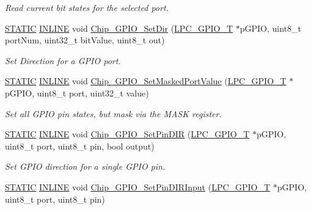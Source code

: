 \begin{DoxyCompactItemize}
\begin{DoxyCompactList}\small\item\em Read current bit states for the selected port. \end{DoxyCompactList}\item 
\hyperlink{group__LPC__Types__Public__Macros_ga10b2d890d871e1489bb02b7e70d9bdfb}{S\+T\+A\+T\+IC} \hyperlink{group__LPC__Types__Public__Types_ga2eb6f9e0395b47b8d5e3eeae4fe0c116}{I\+N\+L\+I\+NE} void \hyperlink{group__GPIO__17XX__40XX_gacc2acb3d50b47954b25ef0ac439993d8}{Chip\+\_\+\+G\+P\+I\+O\+\_\+\+Set\+Dir} (\hyperlink{structLPC__GPIO__T}{L\+P\+C\+\_\+\+G\+P\+I\+O\+\_\+T} $\ast$p\+G\+P\+IO, uint8\+\_\+t port\+Num, uint32\+\_\+t bit\+Value, uint8\+\_\+t out)
\begin{DoxyCompactList}\small\item\em Set Direction for a G\+P\+IO port. \end{DoxyCompactList}\item 
\hyperlink{group__LPC__Types__Public__Macros_ga10b2d890d871e1489bb02b7e70d9bdfb}{S\+T\+A\+T\+IC} \hyperlink{group__LPC__Types__Public__Types_ga2eb6f9e0395b47b8d5e3eeae4fe0c116}{I\+N\+L\+I\+NE} void \hyperlink{group__GPIO__17XX__40XX_ga45e5422fd37f991f4ff46cdc0090efb4}{Chip\+\_\+\+G\+P\+I\+O\+\_\+\+Set\+Masked\+Port\+Value} (\hyperlink{structLPC__GPIO__T}{L\+P\+C\+\_\+\+G\+P\+I\+O\+\_\+T} $\ast$p\+G\+P\+IO, uint8\+\_\+t port, uint32\+\_\+t value)
\begin{DoxyCompactList}\small\item\em Set all G\+P\+IO pin states, but mask via the M\+A\+SK register. \end{DoxyCompactList}\item 
\hyperlink{group__LPC__Types__Public__Macros_ga10b2d890d871e1489bb02b7e70d9bdfb}{S\+T\+A\+T\+IC} \hyperlink{group__LPC__Types__Public__Types_ga2eb6f9e0395b47b8d5e3eeae4fe0c116}{I\+N\+L\+I\+NE} void \hyperlink{group__GPIO__17XX__40XX_gac384ba462a45291528e95945c3273772}{Chip\+\_\+\+G\+P\+I\+O\+\_\+\+Set\+Pin\+D\+IR} (\hyperlink{structLPC__GPIO__T}{L\+P\+C\+\_\+\+G\+P\+I\+O\+\_\+T} $\ast$p\+G\+P\+IO, uint8\+\_\+t port, uint8\+\_\+t pin, bool output)
\begin{DoxyCompactList}\small\item\em Set G\+P\+IO direction for a single G\+P\+IO pin. \end{DoxyCompactList}\item 
\hyperlink{group__LPC__Types__Public__Macros_ga10b2d890d871e1489bb02b7e70d9bdfb}{S\+T\+A\+T\+IC} \hyperlink{group__LPC__Types__Public__Types_ga2eb6f9e0395b47b8d5e3eeae4fe0c116}{I\+N\+L\+I\+NE} void \hyperlink{group__GPIO__17XX__40XX_ga0c20af0c6b9cee61714643bef6614485}{Chip\+\_\+\+G\+P\+I\+O\+\_\+\+Set\+Pin\+D\+I\+R\+Input} (\hyperlink{structLPC__GPIO__T}{L\+P\+C\+\_\+\+G\+P\+I\+O\+\_\+T} $\ast$p\+G\+P\+IO, uint8\+\_\+t port, uint8\+\_\+t pin)

\end{DoxyCompactItemize}
